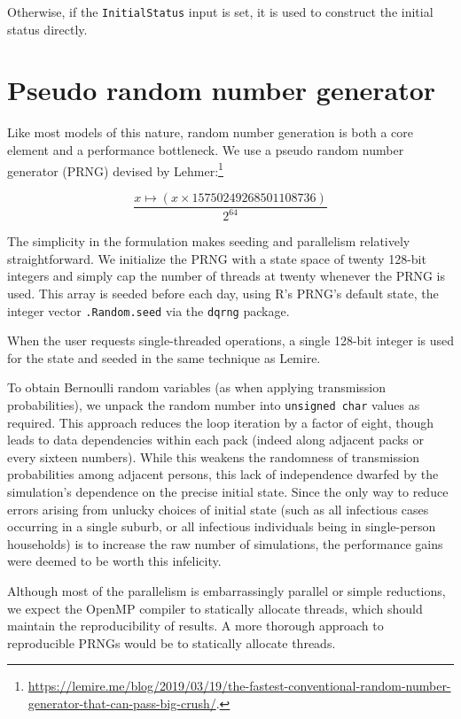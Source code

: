 \documentclass[submission]{grattan}
\newcommand*{\code}[1]{\texttt{#1}}
\begin{document}
Otherwise, if the \code{InitialStatus} input is set, it is used to construct the initial status directly.

\section{Pseudo random number generator}

Like most models of this nature, random number generation is both a core element and
a performance bottleneck.  We use a
pseudo random number generator (PRNG) devised by Lehmer:\footnote{\url{https://lemire.me/blog/2019/03/19/the-fastest-conventional-random-number-generator-that-can-pass-big-crush/}.}

\[ \frac{x \mapsto(x \times 15750249268501108736)}{2^{64}}\]

The simplicity in the formulation makes seeding and parallelism relatively straightforward. We
initialize the PRNG with a state space of twenty 128-bit integers
and simply cap the number of threads at twenty whenever
the PRNG is used. This array is seeded before each day, using R's PRNG's default state, the integer
vector \code{.Random.seed} via
the \code{dqrng} package.

When the user requests single-threaded operations, a single 128-bit integer is used for
the state and seeded in the same technique as Lemire.

 To obtain Bernoulli random variables
(as when applying transmission
probabilities), we unpack the random number into \code{unsigned char} values as required.
This approach reduces the loop iteration by a factor of eight, though leads to data dependencies
within each pack (indeed along adjacent packs or every sixteen numbers). While this weakens
the randomness of transmission probabilities among adjacent persons, this lack of
independence dwarfed by the simulation's dependence on the precise initial state. Since the only way
to reduce errors arising from unlucky choices of initial state (such as all infectious cases occurring
in a single suburb, or all infectious individuals being in single-person households) is to increase
the raw number of simulations, the performance gains were deemed to be worth this infelicity.

Although most of the parallelism is embarrassingly parallel or simple reductions, we expect the OpenMP
compiler to statically allocate threads, which should maintain the reproducibility of results. A more
thorough approach to reproducible PRNGs would be to statically allocate threads.
\end{document}
